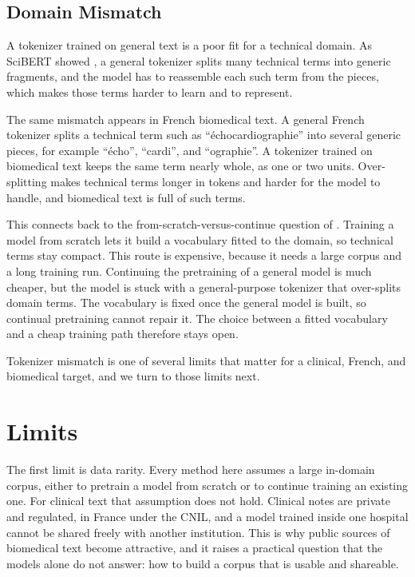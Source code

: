 \subsection{Domain Mismatch}

A tokenizer trained on general text is a poor fit for a technical domain. As SciBERT showed \citep{beltagy_scibert_2019}, a general tokenizer splits many technical terms into generic fragments, and the
model has to reassemble each such term from the pieces, which makes those terms harder to
learn and to represent.

The same mismatch appears in French biomedical text. A general French tokenizer splits a
technical term such as ``échocardiographie'' into several generic pieces, for example
``écho'', ``cardi'', and ``ographie''. A tokenizer trained on biomedical text keeps the
same term nearly whole, as one or two units. Over-splitting makes technical terms longer
in tokens and harder for the model to handle, and biomedical text is full of such terms.

This connects back to the from-scratch-versus-continue question of .
Training a model from scratch lets it build a vocabulary fitted to the domain, so technical
terms stay compact. This route is expensive, because it needs a large corpus and a long
training run. Continuing the pretraining of a general model is much cheaper, but the model
is stuck with a general-purpose tokenizer that over-splits domain terms. The vocabulary is
fixed once the general model is built, so continual pretraining cannot repair it. The choice
between a fitted vocabulary and a cheap training path therefore stays open.

Tokenizer mismatch is one of several limits that matter for a clinical, French, and
biomedical target, and we turn to those limits next.
\section{Limits}
\label{sec:lm-limitations}

The first limit is data rarity. Every method here assumes a large in-domain corpus, either
to pretrain a model from scratch or to continue training an existing one. For clinical text
that assumption does not hold. Clinical notes are private and regulated, in France under
the CNIL, and a model trained inside one hospital cannot be shared freely with another
institution. This is why public sources of biomedical text become attractive, and it
raises a practical question that the models alone do not answer: how to build a corpus that
is usable and shareable.

